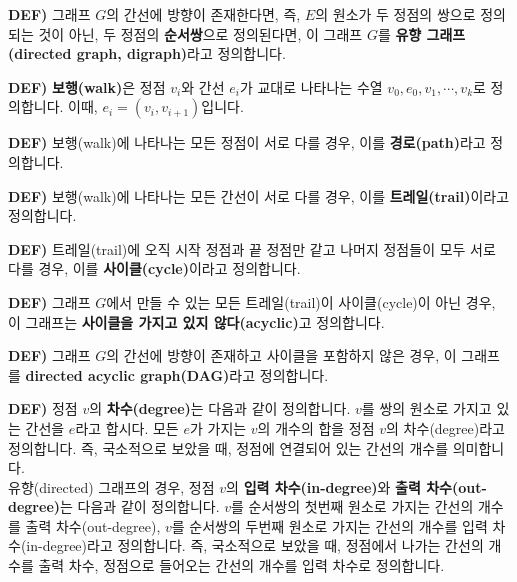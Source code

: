 \documentclass[a4paper]{article}
\begin{document}
\begin{mdframed}
\textbf{DEF)} 그래프 $G$의 간선에 방향이 존재한다면, 즉, $E$의 원소가 두 정점의 쌍으로 정의 되는 것이 아닌, 두 정점의 \textbf{순서쌍}으로 정의된다면, 이 그래프 $G$를 \textbf{유향 그래프(directed graph, digraph)}라고 정의합니다. 
\end{mdframed}

\begin{mdframed}
\textbf{DEF)} \textbf{보행(walk)}은 정점 $v_i$와 간선 $e_i$가 교대로 나타나는 수열 $v_0, e_0, v_1, \cdots, v_k$로 정의합니다. 이때, $e_i = (v_i, v_{i+1})$입니다.
\end{mdframed}

\begin{mdframed}
\textbf{DEF)} 보행(walk)에 나타나는 모든 정점이 서로 다를 경우, 이를 \textbf{경로(path)}라고 정의합니다.
\end{mdframed}

\begin{mdframed}
\textbf{DEF)} 보행(walk)에 나타나는 모든 간선이 서로 다를 경우, 이를 \textbf{트레일(trail)}이라고 정의합니다.
\end{mdframed}

\begin{mdframed}
\textbf{DEF)} 트레일(trail)에 오직 시작 정점과 끝 정점만 같고 나머지 정점들이 모두 서로 다를 경우, 이를 \textbf{사이클(cycle)}이라고 정의합니다.
\end{mdframed}

\begin{mdframed}
\textbf{DEF)} 그래프 $G$에서 만들 수 있는 모든 트레일(trail)이 사이클(cycle)이 아닌 경우, 이 그래프는 \textbf{사이클을 가지고 있지 않다(acyclic)}고 정의합니다.
\end{mdframed}

\begin{mdframed}
\textbf{DEF)} 그래프 $G$의 간선에 방향이 존재하고 사이클을 포함하지 않은 경우, 이 그래프를 \textbf{directed acyclic graph(DAG)}라고 정의합니다.
\end{mdframed}

\begin{mdframed}
\textbf{DEF)} 정점 $v$의 \textbf{차수(degree)}는 다음과 같이 정의합니다. $v$를 쌍의 원소로 가지고 있는 간선을 $e$라고 합시다. 모든 $e$가 가지는 $v$의 개수의 합을 정점 $v$의 차수(degree)라고 정의합니다. 즉, 국소적으로 보았을 때, 정점에 연결되어 있는 간선의 개수를 의미합니다.\\
유향(directed) 그래프의 경우, 정점 $v$의 \textbf{입력 차수(in-degree)}와 \textbf{출력 차수(out-degree)}는 다음과 같이 정의합니다. $v$를 순서쌍의 첫번째 원소로 가지는 간선의 개수를 출력 차수(out-degree), $v$를 순서쌍의 두번째 원소로 가지는 간선의 개수를 입력 차수(in-degree)라고 정의합니다. 즉, 국소적으로 보았을 때, 정점에서 나가는 간선의 개수를 출력 차수, 정점으로 들어오는 간선의 개수를 입력 차수로 정의합니다.
\end{mdframed}
\end{document}
